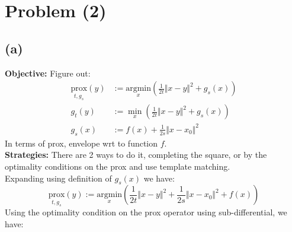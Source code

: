\documentclass[]{article}
\begin{document}
\section*{Problem (2)}
    \subsection*{(a)}
        \textbf{Objective: } Figure out: 
        \begin{align*}\tag{2a0}\label{eqn:2a0}
            \underset{t, g_s}{\text{prox}}(y) &:= 
            \underset{x}{\text{argmin}}
            \left(
                \frac{1}{2t}\Vert x - y\Vert^2 + g_s(x)
            \right)
            \\ 
            g_t(y) &:= \min_x \left(
                \frac{1}{2t}\Vert x - y\Vert^2 + g_s(x)
            \right)
            \\
            g_s(x) &:= f(x) + \frac{1}{2s}\Vert x - x_0\Vert^2
        \end{align*}
        In terms of prox, envelope wrt to function $f$. 
        \\
        \textbf{Strategies: }There are 2 ways to do it, completing the square, or by the optimality conditions on the prox and use template matching. 
        \\
        Expanding using definition of $g_s(x)$ we have: 
        \begin{equation*}\tag{2a1}\label{eqn:2a1}
            \underset{t, g_s}{\text{prox}}(y):= 
            \underset{x}{\text{argmin}} \left(
                \frac{1}{2t} \Vert x - y\Vert^2 
                + 
                \frac{1}{2s} \Vert x - x_0\Vert^2 
                + f(x)
            \right)
        \end{equation*}
        Using the optimality condition on the prox operator using sub-differential, we have: 
\end{document}
